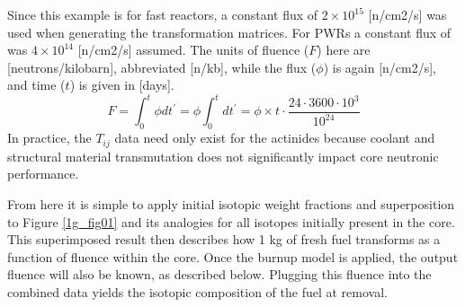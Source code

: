 Since this example is for fast reactors, a constant flux of $2\times10^{15}$ [n/cm2/s] was used 
when generating the transformation matrices.  For PWRs a constant flux of was $4\times10^{14}$ [n/cm2/s] 
assumed.  The units of fluence ($F$) here are [neutrons/kilobarn], abbreviated [n/kb], while the 
flux ($\phi$) is again [n/cm2/s], and time ($t$) is given in [days].
\begin{equation}
\label{fluence}
F = \int_0^t \phi dt^\prime = \phi \int_0^t dt^\prime = \phi \times t \cdot \frac{24 \cdot 3600 \cdot 10^3}{10^{24}}
\end{equation}
In practice, the $T_{ij}$ data need only exist for the actinides because coolant and structural 
material transmutation does not significantly impact core neutronic performance.

From here it is simple to apply initial isotopic weight fractions and superposition to Figure \ref{1g_fig01}
and its analogies for all isotopes initially present in the core.  This superimposed result then describes 
how 1 kg of fresh fuel transforms as a function of fluence within the core. Once the burnup model is applied, 
the output fluence will also be known, as described below.  Plugging this fluence into the combined data 
yields the isotopic composition of the fuel at removal. 



